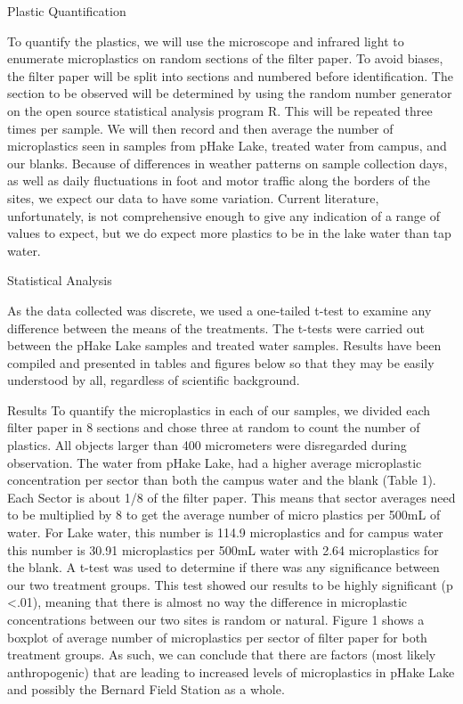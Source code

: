\documentclass[]{article}
\begin{document}
Plastic Quantification

To quantify the plastics, we will use the microscope and infrared light
to enumerate microplastics on random sections of the filter paper. To
avoid biases, the filter paper will be split into sections and numbered
before identification. The section to be observed will be determined by
using the random number generator on the open source statistical
analysis program R. This will be repeated three times per sample. We
will then record and then average the number of microplastics seen in
samples from pHake Lake, treated water from campus, and our blanks.
Because of differences in weather patterns on sample collection days, as
well as daily fluctuations in foot and motor traffic along the borders
of the sites, we expect our data to have some variation. Current
literature, unfortunately, is not comprehensive enough to give any
indication of a range of values to expect, but we do expect more
plastics to be in the lake water than tap water.

Statistical Analysis

As the data collected was discrete, we used a one-tailed t-test to
examine any difference between the means of the treatments. The t-tests
were carried out between the pHake Lake samples and treated water
samples. Results have been compiled and presented in tables and figures
below so that they may be easily understood by all, regardless of
scientific background.

Results To quantify the microplastics in each of our samples, we divided
each filter paper in 8 sections and chose three at random to count the
number of plastics. All objects larger than 400 micrometers were
disregarded during observation. The water from pHake Lake, had a higher
average microplastic concentration per sector than both the campus water
and the blank (Table 1). Each Sector is about 1/8 of the filter paper.
This means that sector averages need to be multiplied by 8 to get the
average number of micro plastics per 500mL of water. For Lake water,
this number is 114.9 microplastics and for campus water this number is
30.91 microplastics per 500mL water with 2.64 microplastics for the
blank. A t-test was used to determine if there was any significance
between our two treatment groups. This test showed our results to be
highly significant (p \textless{}.01), meaning that there is almost no
way the difference in microplastic concentrations between our two sites
is random or natural. Figure 1 shows a boxplot of average number of
microplastics per sector of filter paper for both treatment groups. As
such, we can conclude that there are factors (most likely anthropogenic)
that are leading to increased levels of microplastics in pHake Lake and
possibly the Bernard Field Station as a whole.
\end{document}

